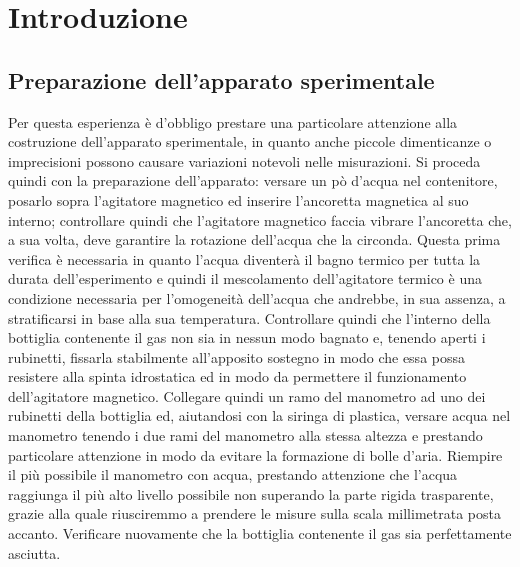 \section{Introduzione}
\subsection{Preparazione dell'apparato sperimentale}

Per questa esperienza è d'obbligo prestare una particolare attenzione alla costruzione dell'apparato sperimentale, in quanto anche piccole dimenticanze o imprecisioni possono causare variazioni notevoli nelle misurazioni.
Si proceda quindi con la preparazione dell'apparato: versare un pò d'acqua nel contenitore, posarlo sopra l'agitatore magnetico ed inserire l'ancoretta magnetica al suo interno; controllare quindi che l'agitatore magnetico faccia vibrare l'ancoretta che, a sua volta, deve garantire la rotazione dell'acqua che la circonda.
Questa prima verifica è necessaria in quanto l'acqua diventerà il bagno termico per tutta la durata dell'esperimento e quindi il mescolamento dell'agitatore termico è una condizione necessaria per l'omogeneità dell'acqua che andrebbe, in sua assenza, a stratificarsi in base alla sua temperatura.
Controllare quindi che l'interno della bottiglia contenente il gas non sia in nessun modo bagnato e, tenendo aperti i rubinetti, fissarla stabilmente all'apposito sostegno in modo che essa possa resistere alla spinta idrostatica ed in modo da permettere il funzionamento dell'agitatore magnetico.
Collegare quindi un ramo del manometro ad uno dei rubinetti della bottiglia ed, aiutandosi con la siringa di plastica, versare acqua nel manometro tenendo i due rami del manometro alla stessa altezza e prestando particolare attenzione in modo da evitare la formazione di bolle d'aria.
Riempire il più possibile il manometro con acqua, prestando attenzione che l'acqua raggiunga il più alto livello possibile non superando la parte rigida trasparente, grazie alla quale riusciremmo a prendere le misure sulla scala millimetrata posta accanto.
Verificare nuovamente che la bottiglia contenente il gas sia perfettamente asciutta.

